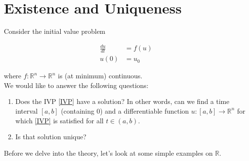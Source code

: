 \documentclass{article}
\newcounter{question}
\def\R{{\mathbb R}}
\begin{document}
\section{Existence and Uniqueness}

Consider the initial value problem

\begin{align}\label{IVP}
\frac{du}{dt} &= f(u) \\
u(0) &= u_0 \nonumber
\end{align}

where $f: \R^n \rightarrow \R^n$ is (at minimum) continuous.\\

We would like to answer the following questions:
\begin{enumerate}
	\item Does the IVP \eqref{IVP} have a solution? In other words, can we find a time interval $[a, b]$ (containing 0) and a differentiable function $u: [a, b] \rightarrow \R^n$ for which \eqref{IVP} is satisfied for all $t \in (a, b)$.
	\item Is that solution unique?
\end{enumerate}

Before we delve into the theory, let's look at some simple examples on $\R$.
\end{document}
